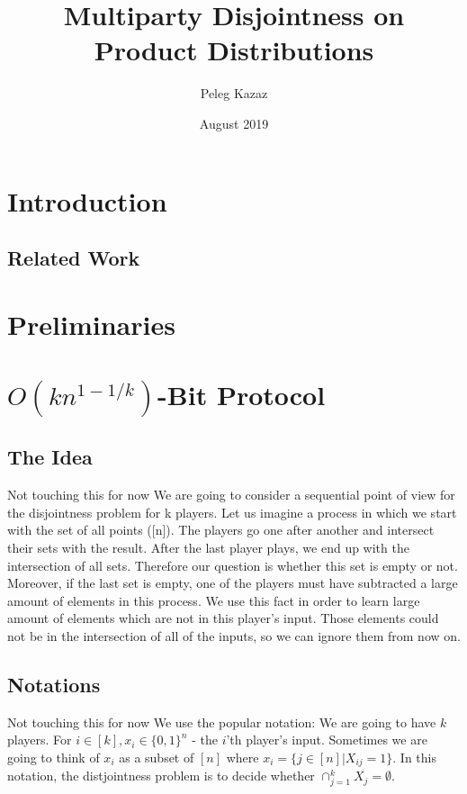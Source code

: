 \documentclass{article}
\title{Multiparty Disjointness on Product Distributions}
\author{Peleg Kazaz}
\date{August 2019}
\newcommand{\Rnote}[1]{ { \color{magenta} #1 } }
\theoremstyle{plain}
\begin{document}
\maketitle


\section{Introduction}

\subsection{Related Work}
\section{Preliminaries}

\section{$O(kn^{1-1/k})$-Bit Protocol}
\subsection{The Idea}
\Rnote{Not touching this for now}
We are going to consider a sequential point of view for the disjointness problem for k players. Let us imagine a process in which we start with the set of all points ([n]). The players go one after another and intersect their sets with the result. After the last player plays, we end up with the intersection of all sets. Therefore our question is whether this set is empty or not. Moreover, if the last set is empty, one of the players must have subtracted a large amount of elements in this process. We use this fact in order to learn large amount of elements which are not in this player's input. Those elements could not be in the intersection of all of the inputs, so we can ignore them from now on. 
\subsection{Notations}
\Rnote{Not touching this for now}
We use the popular notation: We are going to have $k$ players. For $i \in [k], x_i \in \{0,1\}^{n}$ - the $i$'th player's input. Sometimes we are going to think of $x_i$ as a subset of $[n]$ where $x_i = \{j \in [n] | X_{ij} = 1\}$. In this notation, the distjointness problem is to decide whether $\cap^{k}_{j=1}X_j = \emptyset$.
\end{document}
